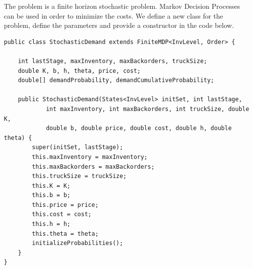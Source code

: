 \documentclass[11pt]{article}
\begin{document}
The problem is a finite horizon stochastic problem. Markov Decision Processes can be used in order to minimize the costs. We define a new class for the problem, define the parameters and provide a constructor in the code below. 
\begin{lstlisting}
public class StochasticDemand extends FiniteMDP<InvLevel, Order> {

    int lastStage, maxInventory, maxBackorders, truckSize;
    double K, b, h, theta, price, cost;
    double[] demandProbability, demandCumulativeProbability;

    public StochasticDemand(States<InvLevel> initSet, int lastStage,
            int maxInventory, int maxBackorders, int truckSize, double K,
            double b, double price, double cost, double h, double theta) {
        super(initSet, lastStage);
        this.maxInventory = maxInventory;
        this.maxBackorders = maxBackorders;
        this.truckSize = truckSize;
        this.K = K;
        this.b = b;
        this.price = price;
        this.cost = cost;
        this.h = h;
        this.theta = theta;
        initializeProbabilities();
    }
}
\end{lstlisting}
\end{document}
